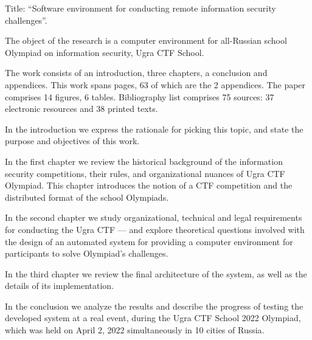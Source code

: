 Title: ``Software environment for conducting remote information security challenges''.

The object of the research is a computer environment for all-Russian school Olympiad on information security, Ugra CTF School.

The work consists of an introduction, three chapters, a conclusion and appendices. This work spans \pageref{LastPage} pages, 63 of which are the 2 appendices. The paper comprises 14 figures, 6 tables. Bibliography list comprises 75 sources: 37 electronic resources and 38 printed texts.

In the introduction we express the rationale for picking this topic, and state the purpose and objectives of this work.

In the first chapter we review the historical background of the information security competitions, their rules, and organizational nuances of Ugra CTF Olympiad. This chapter introduces the notion of a CTF competition and the distributed format of the school Olympiads.

In the second chapter we study organizational, technical and legal requirements for conducting the Ugra CTF --- and explore theoretical questions involved with the design of an automated system for providing a computer environment for participants to solve Olympiad's challenges.

In the third chapter we review the final architecture of the system, as well as the details of its implementation.

In the conclusion we analyze the results and describe the progress of testing the developed system at a real event, during the Ugra CTF School 2022 Olympiad, which was held on April 2, 2022 simultaneously in 10 cities of Russia.

